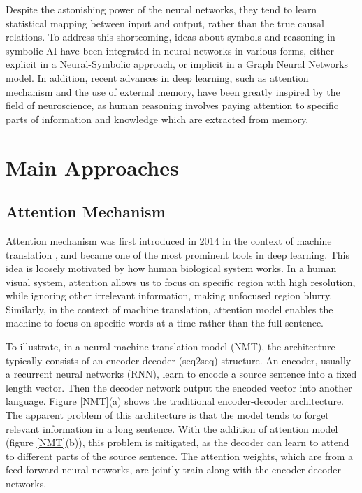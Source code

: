 \documentclass[journal]{IEEEtran}
\begin{document}
Despite the astonishing power of the neural networks, they tend to learn statistical mapping between input and output, rather than the true causal relations. 
To address this shortcoming, ideas about symbols and reasoning in symbolic AI have been integrated in neural networks in various forms, 
either explicit in a Neural-Symbolic approach, or implicit in a Graph Neural Networks model.
In addition, recent advances in deep learning, such as attention mechanism and the use of external memory, have been greatly inspired by the field of neuroscience, as 
human reasoning involves paying attention to specific parts of information and knowledge which are extracted from memory.

\section{Main Approaches}
\subsection{Attention Mechanism}
Attention mechanism was first introduced in 2014 in the context of machine translation \cite{bahdanau2014neural}, 
and became one of the most prominent tools in deep learning. 
This idea is loosely motivated by how human biological system works. 
In a human visual system, attention allows us to focus on specific region with high resolution, 
while ignoring other irrelevant information, making unfocused region blurry.
Similarly, in the context of machine translation, attention model enables the machine to focus on specific words at a time 
rather than the full sentence.

To illustrate, in a neural machine translation model (NMT), the architecture typically consists of an encoder-decoder (seq2seq) structure.
An encoder, usually a recurrent neural networks (RNN), learn to encode a source sentence into a fixed length vector.
Then the decoder network output the encoded vector into another language. Figure \ref{NMT}(a) shows the traditional encoder-decoder architecture.
The apparent problem of this architecture is that the model tends to forget relevant information in a long sentence.
With the addition of attention model (figure \ref{NMT}(b)), this problem is mitigated, 
as the decoder can learn to attend to different parts of the source sentence. 
The attention weights, which are from a feed forward neural networks, are jointly train along with the encoder-decoder networks.
\end{document}

